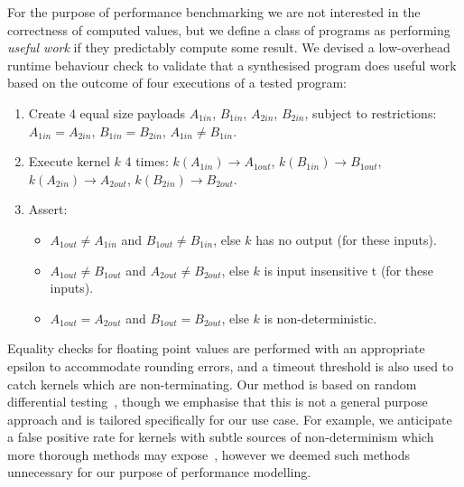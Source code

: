For the purpose of performance benchmarking we are not interested in the correctness of computed values, but we define a class of programs as performing \emph{useful work} if they predictably compute some result. We devised a low-overhead runtime behaviour check to validate that a synthesised program does useful work based on the outcome of four executions of a tested program:%
%
\begin{enumerate}
\item Create 4 equal size payloads $A_{1in}$, $B_{1in}$, $A_{2in}$,
  $B_{2in}$, subject to restrictions: $A_{1in}=A_{2in}$,
  $B_{1in}=B_{2in}$, $A_{1in} \ne B_{1in}$.
\item Execute kernel $k$ 4 times: $k(A_{1in}) \rightarrow A_{1out}$,
  $k(B_{1in}) \rightarrow B_{1out}$,
  $k(A_{2in}) \rightarrow A_{2out}$,
  $k(B_{2in}) \rightarrow B_{2out}$.
\item Assert:
  \begin{itemize}
  \item $A_{1out} \ne A_{1in}$ and $B_{1out} \ne B_{1in}$, else $k$ has no
  output (for these inputs).%
  \item $A_{1out} \ne B_{1out}$ and $A_{2out} \ne B_{2out}$, else $k$ is input insensitive t (for these inputs).%
  \item $A_{1out}=A_{2out}$ and $B_{1out}=B_{2out}$, else $k$ is
  non-deterministic.
  \end{itemize}
\end{enumerate}
%
\noindent%
Equality checks for floating point values are performed with an appropriate epsilon to accommodate rounding errors, and a timeout threshold is also used to catch kernels which are non-terminating. Our method is based on random differential testing~\cite{McKeeman1998}, though we emphasise that this is not a general purpose approach and is tailored specifically for our use case. For example, we anticipate a false positive rate for kernels with subtle sources of non-determinism which more thorough methods may expose~\cite{Betts2012,Price2015,Sorensen2016}, however we deemed such methods unnecessary for our purpose of performance modelling.